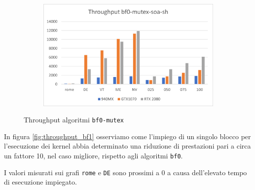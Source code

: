\documentclass[12pt,a4paper,oneside]{book}
\begin{document}
\begin{figure}[b]
\begin{subfigure}{.5\textwidth}
		\end{subfigure}%
		\begin{subfigure}{.5\textwidth}
			\centering
			\includegraphics[width=\textwidth]{throughput_bf0-mutex-soa-sh}
		\end{subfigure}
		\caption{Throughput algoritmi \texttt{bf0-mutex}}
		\label{fig:throughput_bf0-mutex}
	\end{figure}

	In figura \ref{fig:throughput_bf1} osserviamo come l'impiego di un singolo blocco per l'esecuzione dei kernel abbia determinato una riduzione di prestazioni pari a circa un fattore 10, nel caso migliore, rispetto agli algoritmi \texttt{bf0}.
	
	I valori misurati sui grafi \texttt{rome} e \texttt{DE} sono prossimi a $0$ a causa dell'elevato tempo di esecuzione impiegato.
\end{document}
